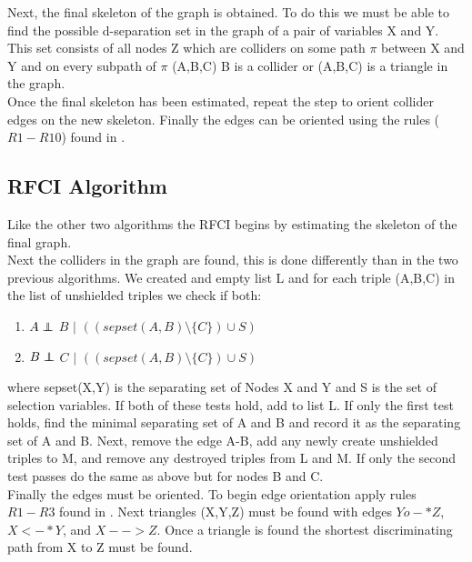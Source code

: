 \documentclass{article}
\newcommand\independent{\protect\mathpalette{\protect\independenT}{\perp}}
\def\independenT#1#2{\mathrel{\rlap{$#1#2$}\mkern2mu{#1#2}}}
\begin{document}
Next, the final skeleton of the graph is obtained. To do this we must be able to find the possible d-separation set in the graph of a pair of variables X and Y. This set consists of all nodes Z which are colliders on some path $\pi$ between X and Y and on every subpath of $\pi$ (A,B,C) B is a collider or (A,B,C) is a triangle in the graph.
\\

Once the final skeleton has been estimated, repeat the step to orient collider edges on the new skeleton. Finally the edges can be oriented using the rules ($R1-R10$) found in \cite{ZHANG20081873}.\cite{colombo2012learning}
\\


\subsection{RFCI Algorithm}
Like the other two algorithms the RFCI begins by estimating the skeleton of the final graph.
\\

Next the colliders in the graph are found, this is done differently than in the two previous algorithms. We created and empty list L and for each triple (A,B,C) in the list of unshielded triples we check if both:
\\

\begin{enumerate}[i]
	\item $A \independent$ $B$ $|$ $((sepset(A,B) \setminus \{C\})\cup S)$
	\item $B \independent$ $C$ $|$ $((sepset(A,B) \setminus \{C\})\cup S)$\end{enumerate}
where sepset(X,Y) is the separating set of Nodes X and Y and S is the set of selection variables. If both of these tests hold, add to list L. If only the first test holds, find the minimal separating set of A and B and record it as the separating set of A and B. Next, remove the edge A-B, add any newly create unshielded triples to M, and remove any destroyed triples from L and M. If only the second test passes do the same as above but for nodes B and C.
\\

Finally the edges must be oriented. To begin edge orientation apply rules $R1-R3$ found in \cite{ZHANG20081873}. Next triangles (X,Y,Z) must be found with edges $Yo-*Z$, $X<-*Y$, and $X-->Z$. Once a triangle is found the shortest discriminating path from X to Z must be found.
\\
\end{document}
